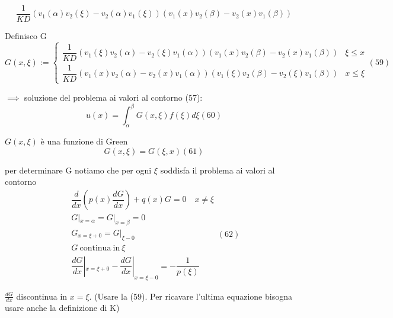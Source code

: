 \documentclass[a4paper,11pt]{report}
\begin{document}
$$
\dfrac{1}{KD}(v_1(\alpha)v_2(\xi)-v_2(\alpha)v_1(\xi))(v_1(x)v_2(\beta)-v_2(x)v_1(\beta))
$$

Definisco G
\begin{equation}
G(x,\xi):=\left\{\begin{matrix}
\dfrac{1}{KD}(v_1(\xi)v_2(\alpha)-v_2(\xi)v_1(\alpha))(v_1(x)v_2(\beta)-v_2(x)v_1(\beta)) & \xi\leq x \\
\dfrac{1}{KD}(v_1(x)v_2(\alpha)-v_2(x)v_1(\alpha))(v_1(\xi)v_2(\beta)-v_2(\xi)v_1(\beta)) & x\leq \xi
\end{matrix}\right. (59)
\end{equation}

$\implies$ soluzione del problema ai valori al contorno (57):
\begin{equation}
u(x)=\int_\alpha^\beta G(x,\xi)f(\xi)d\xi (60)
\end{equation}

$G(x,\xi)$ è una funzione di Green
\begin{equation}
G(x,\xi)=G(\xi,x) (61)
\end{equation}


per determinare G notiamo che per ogni $\xi$ soddisfa il problema ai valori al contorno
\begin{equation}
\begin{matrix}
\dfrac{d}{dx}\left(p(x)\dfrac{dG}{dx}\right) + q(x)G = 0 \quad x\neq \xi \\
G|_{x=\alpha}=G|_{x=\beta}=0 \\
G_{x=\xi+0}=G|_{\xi-0} \\
G \mathrm{~continua~in~} \xi \\
\dfrac{dG}{dx}|_{x=\xi+0}-\dfrac{dG}{dx}|_{x=\xi-0}=-\dfrac{1}{p(\xi)}
\end{matrix} (62)
\end{equation}


$\frac{dG}{dx}$ discontinua in $x=\xi$. (Usare la (59). Per ricavare l'ultima equazione bisogna usare anche la definizione di K)
\end{document}
